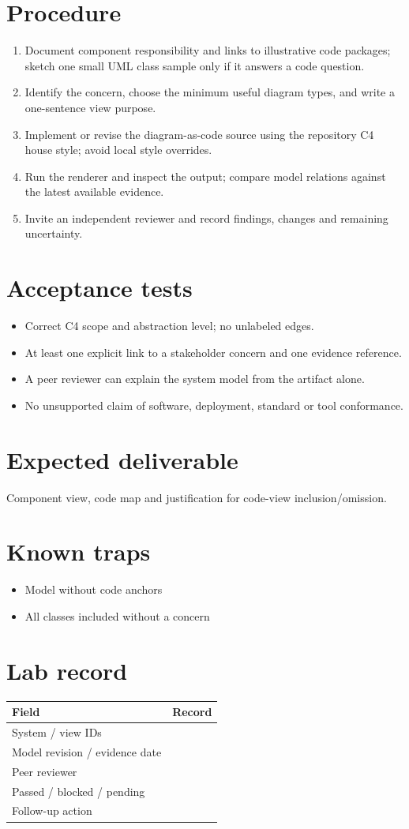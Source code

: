 \documentclass[10pt,letterpaper]{article}
\begin{document}
\section{Procedure}
\begin{enumerate}
\item Document component responsibility and links to illustrative code packages; sketch one small UML class sample only if it answers a code question.
\item Identify the concern, choose the minimum useful diagram types, and write a one-sentence view purpose.
\item Implement or revise the diagram-as-code source using the repository C4 house style; avoid local style overrides.
\item Run the renderer and inspect the output; compare model relations against the latest available evidence.
\item Invite an independent reviewer and record findings, changes and remaining uncertainty.
\end{enumerate}

\section{Acceptance tests}
\begin{itemize}
\item Correct C4 scope and abstraction level; no unlabeled edges.
\item At least one explicit link to a stakeholder concern and one evidence reference.
\item A peer reviewer can explain the system model from the artifact alone.
\item No unsupported claim of software, deployment, standard or tool conformance.
\end{itemize}

\section{Expected deliverable}
Component view, code map and justification for code-view inclusion/omission.


\section{Known traps}
\begin{itemize}
\item Model without code anchors
\item All classes included without a concern
\end{itemize}

\section{Lab record}
\begin{tabularx}{\linewidth}{@{}YY@{}}\toprule
\textbf{Field} & \textbf{Record} \\ \midrule
System / view IDs &  \\
Model revision / evidence date &  \\
Peer reviewer &  \\
Passed / blocked / pending &  \\
Follow-up action &  \\
\bottomrule\end{tabularx}
\end{document}
